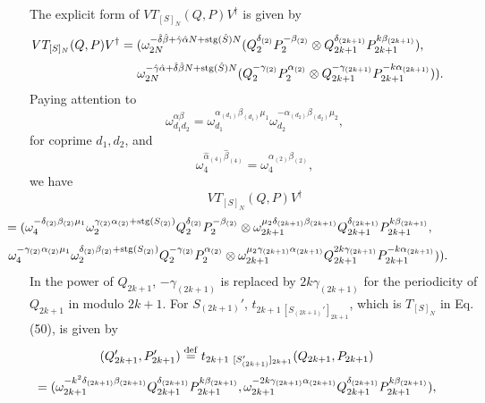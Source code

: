 \documentclass[12pt]{iopart}
\newcommand{\deq}{\stackrel{\rm{\tiny def}}{=}}
\begin{document}
The explicit form of \(VT_{[S]_N}(Q,P)V^\dagger\) is given by
\[
\hspace{-15mm}
VT_{[S]_N}(Q,P)V^\dagger
=
(\omega_{2N}^{-\hat\delta\hat\beta+\hat\gamma\hat\alpha N+{\rm stg}(\hat S)N}
(Q_2^{\delta_{(2)}}
P_2^{-\beta_{(2)}}
\otimes
Q_{2k+1}^{\delta_{(2k+1)}}
P_{2k+1}^{k\beta_{(2k+1)}}),
\]
\begin{equation}
\hspace{20mm}
\omega_{2N}^{-\hat\gamma\hat\alpha+\hat\delta\hat\beta N+{\rm stg}(\hat S)N}
(Q_2^{-\gamma_{(2)}}
P_2^{\alpha_{(2)}}
\otimes
Q_{2k+1}^{-\gamma_{(2k+1)}}
P_{2k+1}^{-k\alpha_{(2k+1)}})).
\end{equation}
%
Paying attention to
\begin{equation}
\omega_{d_1d_2}^{\alpha\beta}
=
\omega_{d_1}^{\alpha_{(d_1)}\beta_{(d_1)}\mu_1}
\omega_{d_2}^{-\alpha_{(d_2)}\beta_{(d_2)}\mu_2},
\end{equation}
for coprime \(d_1,d_2\), and
\begin{equation}
\omega_4^{\hat\alpha_{(4)}\hat\beta_{(4)}}
=
\omega_4^{\alpha_{(2)}\beta_{(2)}},
\end{equation}
we have
\[
VT_{[S]_N}(Q,P)V^\dagger
\]
\[
\hspace{-20mm}
=
(\omega_{4}^{-\delta_{(2)}\beta_{(2)}\mu_1}
\omega_2^{\gamma_{(2)}\alpha_{(2)}+{\rm stg}(S_{(2)})}
Q_2^{\delta_{(2)}}
P_2^{-\beta_{(2)}}
\otimes
\omega_{2k+1}^{\mu_2\delta_{(2k+1)}\beta_{(2k+1)}}
Q_{2k+1}^{\delta_{(2k+1)}}
P_{2k+1}^{k\beta_{(2k+1)}},
\]
\begin{equation}
\hspace{-15mm}
\omega_{4}^{-\gamma_{(2)}\alpha_{(2)}\mu_1}
\omega_2^{\delta_{(2)}\beta_{(2)}+{\rm stg}(S_{(2)})}
Q_2^{-\gamma_{(2)}}
P_2^{\alpha_{(2)}}
\otimes
\omega_{2k+1}^{\mu_2\gamma_{(2k+1)}\alpha_{(2k+1)}}
Q_{2k+1}^{2k\gamma_{(2k+1)}}
P_{2k+1}^{-k\alpha_{(2k+1)}})).
\end{equation}
In the power of \(Q_{2k+1}\),
\(-\gamma_{(2k+1)}\) is replaced by \(2k\gamma_{(2k+1)}\) for the periodicity of \(Q_{2k+1}\) in modulo \(2k+1\).
For \(S_{(2k+1)}'\), \(t_{2k+1\ [S_{(2k+1)}']_{2k+1}}\), which is \(T_{[S]_N}\) in Eq.(50), is given by
\[
\hspace{-10mm}
(Q_{2k+1}',P_{2k+1}')
\deq
t_{2k+1\ [S_{(2k+1)}']_{2k+1}}(Q_{2k+1},P_{2k+1})
\]
\begin{equation}
\hspace{-10mm}
=
(\omega_{2k+1}^{-k^2\delta_{(2k+1)}\beta_{(2k+1)}}
Q_{2k+1}^{\delta_{(2k+1)}}
P_{2k+1}^{k\beta_{(2k+1)}},
\omega_{2k+1}^{-2k\gamma_{(2k+1)}\alpha_{(2k+1)}}
Q_{2k+1}^{\delta_{(2k+1)}}
P_{2k+1}^{k\beta_{(2k+1)}}),
\end{equation}
\end{document}

